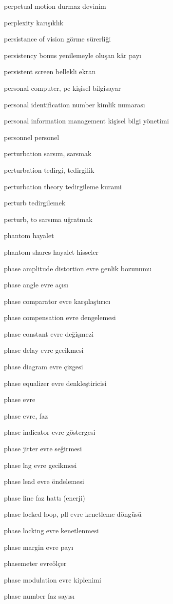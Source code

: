 \documentclass[12pt,fleqn]{article}\usepackage{../../common}
\begin{document}
perpetual motion durmaz devinim

perplexity karışıklık

persistance of vision görme sürerliği

persistency bonus yenilemeyle oluşan kâr payı

persistent screen bellekli ekran

personal computer, pc kişisel bilgisayar

personal identification number kimlik numarası

personal information management kişisel bilgi yönetimi

personnel personel

perturbation sarsım, sarsmak

perturbation tedirgi, tedirgilik

perturbation theory tedirgileme kurami

perturb tedirgilemek

perturb, to sarsıma uğratmak

phantom hayalet

phantom shares hayalet hisseler

phase amplitude distortion evre genlik bozunumu

phase angle evre açısı

phase comparator evre karşılaştırıcı

phase compensation evre dengelemesi

phase constant evre değişmezi

phase delay evre gecikmesi

phase diagram evre çizgesi

phase equalizer evre denkleştiricisi

phase evre

phase evre, faz

phase indicator evre göstergesi

phase jitter evre seğirmesi

phase lag evre gecikmesi

phase lead evre öndelemesi

phase line faz hattı (enerji)

phase locked loop, pll evre kenetleme döngüsü

phase locking evre kenetlenmesi

phase margin evre payı

phasemeter evreölçer

phase modulation evre kiplenimi

phase number faz sayısı
\end{document}

